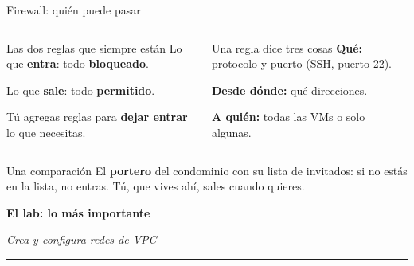 \documentclass[aspectratio=169,10pt,c]{beamer}
\newcommand{\separador}[2]{%
\begin{frame}[plain]
\vfill
\begin{center}
{\fontsize{29}{34}\selectfont\bfseries #1}\par
\vspace{2mm}
{\small #2}\par
\vspace{4mm}
{\color{utpRojo}\rule{8.5cm}{1.2pt}}
\end{center}
\vfill
\end{frame}}
\begin{document}
\begin{frame}{Firewall: quién puede pasar}
\begin{center}
\end{center}
\begin{columns}[T,onlytextwidth]
\begin{block}{Las dos reglas que siempre están}
\small Lo que \textbf{entra}: todo \textbf{bloqueado}.\par
Lo que \textbf{sale}: todo \textbf{permitido}.\par\smallskip
Tú agregas reglas para \textbf{dejar entrar} lo que necesitas.
\end{block}
\begin{exampleblock}{Una regla dice tres cosas}
\small
\textbf{Qué:} protocolo y puerto (SSH, puerto 22).\par
\textbf{Desde dónde:} qué direcciones.\par
\textbf{A quién:} todas las VMs o solo algunas.
\end{exampleblock}
\end{columns}
\par\vspace{1mm}
\begin{alertblock}{Una comparación}
\small El \textbf{portero} del condominio con su lista de invitados: si no estás en la lista, no entras. Tú, que vives ahí, sales cuando quieres.
\end{alertblock}
\end{frame}

\separador{El lab: lo más importante}{\emph{Crea y configura redes de VPC}}
\end{document}
